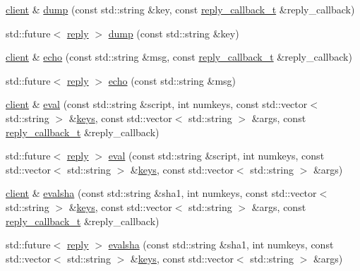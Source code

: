 \begin{DoxyCompactItemize}
\item 
\hyperlink{classcpp__redis_1_1client}{client} \& \hyperlink{classcpp__redis_1_1client_aed6bb7657acdd4ea4dd0a4e7ec3eec20}{dump} (const std\+::string \&key, const \hyperlink{classcpp__redis_1_1client_a061a1140d36d2eaeda82b09a0bb3f9f2}{reply\+\_\+callback\+\_\+t} \&reply\+\_\+callback)
\item 
std\+::future$<$ \hyperlink{classcpp__redis_1_1reply}{reply} $>$ \hyperlink{classcpp__redis_1_1client_aa25f7f2648c1a013ce079ef13e8e2f0f}{dump} (const std\+::string \&key)
\item 
\hyperlink{classcpp__redis_1_1client}{client} \& \hyperlink{classcpp__redis_1_1client_a285d35a355052ae1757d13ecec0539e8}{echo} (const std\+::string \&msg, const \hyperlink{classcpp__redis_1_1client_a061a1140d36d2eaeda82b09a0bb3f9f2}{reply\+\_\+callback\+\_\+t} \&reply\+\_\+callback)
\item 
std\+::future$<$ \hyperlink{classcpp__redis_1_1reply}{reply} $>$ \hyperlink{classcpp__redis_1_1client_af0e3462a35f72aeae1527f0cb3cc8570}{echo} (const std\+::string \&msg)
\item 
\hyperlink{classcpp__redis_1_1client}{client} \& \hyperlink{classcpp__redis_1_1client_aeb773d0e0cacb766a0c4c7641bd91ebf}{eval} (const std\+::string \&script, int numkeys, const std\+::vector$<$ std\+::string $>$ \&\hyperlink{classcpp__redis_1_1client_acb7845a206b2321e6919c2f38282c322}{keys}, const std\+::vector$<$ std\+::string $>$ \&args, const \hyperlink{classcpp__redis_1_1client_a061a1140d36d2eaeda82b09a0bb3f9f2}{reply\+\_\+callback\+\_\+t} \&reply\+\_\+callback)
\item 
std\+::future$<$ \hyperlink{classcpp__redis_1_1reply}{reply} $>$ \hyperlink{classcpp__redis_1_1client_a01b328b664e5cf604150e3d0f881ff4c}{eval} (const std\+::string \&script, int numkeys, const std\+::vector$<$ std\+::string $>$ \&\hyperlink{classcpp__redis_1_1client_acb7845a206b2321e6919c2f38282c322}{keys}, const std\+::vector$<$ std\+::string $>$ \&args)
\item 
\hyperlink{classcpp__redis_1_1client}{client} \& \hyperlink{classcpp__redis_1_1client_a71cd73130b4755c9f4da3b602b09a1be}{evalsha} (const std\+::string \&sha1, int numkeys, const std\+::vector$<$ std\+::string $>$ \&\hyperlink{classcpp__redis_1_1client_acb7845a206b2321e6919c2f38282c322}{keys}, const std\+::vector$<$ std\+::string $>$ \&args, const \hyperlink{classcpp__redis_1_1client_a061a1140d36d2eaeda82b09a0bb3f9f2}{reply\+\_\+callback\+\_\+t} \&reply\+\_\+callback)
\item 
std\+::future$<$ \hyperlink{classcpp__redis_1_1reply}{reply} $>$ \hyperlink{classcpp__redis_1_1client_a3ab7684f292037dc3918c32549b7ad53}{evalsha} (const std\+::string \&sha1, int numkeys, const std\+::vector$<$ std\+::string $>$ \&\hyperlink{classcpp__redis_1_1client_acb7845a206b2321e6919c2f38282c322}{keys}, const std\+::vector$<$ std\+::string $>$ \&args)

\end{DoxyCompactItemize}
